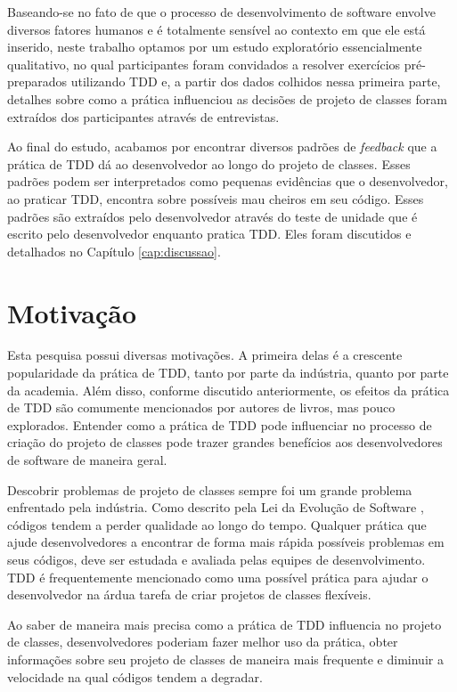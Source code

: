 Baseando-se no fato de que o processo de desenvolvimento de software envolve 
diversos fatores humanos e é totalmente sensível ao contexto em que ele está 
inserido, 
neste trabalho optamos por um estudo exploratório
essencialmente qualitativo,
no qual participantes foram convidados a resolver exercícios 
pré-preparados utilizando TDD e, a partir 
dos dados colhidos nessa primeira parte, detalhes sobre como a prática influenciou as 
decisões de projeto de classes foram extraídos dos participantes através de 
entrevistas.

Ao final do estudo, acabamos por encontrar diversos padrões de \textit{feedback}
que a prática de TDD dá ao desenvolvedor ao longo do projeto de classes. Esses
padrões podem ser interpretados como pequenas evidências que o desenvolvedor,
ao praticar TDD, encontra sobre possíveis mau cheiros em seu código. Esses
padrões são extraídos pelo desenvolvedor através do teste de unidade que é
escrito pelo desenvolvedor enquanto pratica TDD. Eles foram discutidos
e detalhados no Capítulo \ref{cap:discussao}.

\section{Motivação}

Esta pesquisa possui diversas motivações. A primeira delas é a crescente
popularidade da prática de TDD, tanto por parte da indústria, quanto 
por parte da academia. Além disso,
conforme discutido anteriormente, os efeitos da prática de TDD são
comumente mencionados por autores de livros, mas pouco explorados. 
Entender como a prática de TDD pode influenciar no processo
de criação do projeto de classes pode trazer grandes benefícios
aos desenvolvedores de software de maneira geral.

Descobrir problemas de projeto de classes sempre foi um grande problema
enfrentado pela indústria. Como descrito pela Lei da Evolução de Software
\cite{lehman}, códigos tendem a perder qualidade ao longo do tempo. Qualquer
prática que ajude desenvolvedores a encontrar de forma mais rápida possíveis
problemas em seus códigos, deve ser estudada e avaliada pelas equipes de
desenvolvimento. TDD é frequentemente mencionado como uma possível prática para
ajudar o desenvolvedor na árdua tarefa de criar projetos de classes flexíveis.

Ao saber de maneira mais precisa
como a prática de TDD influencia no projeto de classes, desenvolvedores poderiam
fazer melhor uso da prática, obter informações sobre seu projeto de classes
de maneira mais frequente e diminuir a velocidade na qual códigos
tendem a degradar.


